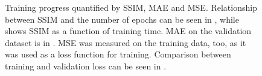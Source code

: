 \begin{figure}[ht]
\begin{subcaptionblock}[t]{0.49\textwidth}
        \caption{\label{fig:train_val_mse_epoch}}
    \end{subcaptionblock}
    \captionsetup{subrefformat=parens}
    \caption[Training progress]{\label{fig:training}Training progress quantified by \gls{SSIM}, \gls{MAE} and \gls{MSE}. Relationship between \gls{SSIM} and the number of epochs can be seen in , while  shows \gls{SSIM} as a function of training time. \gls{MAE} on the validation dataset is in . \gls{MSE} was measured on the training data, too, as it was used as a loss function for training. Comparison between training and validation loss can be seen in .}
\end{figure}